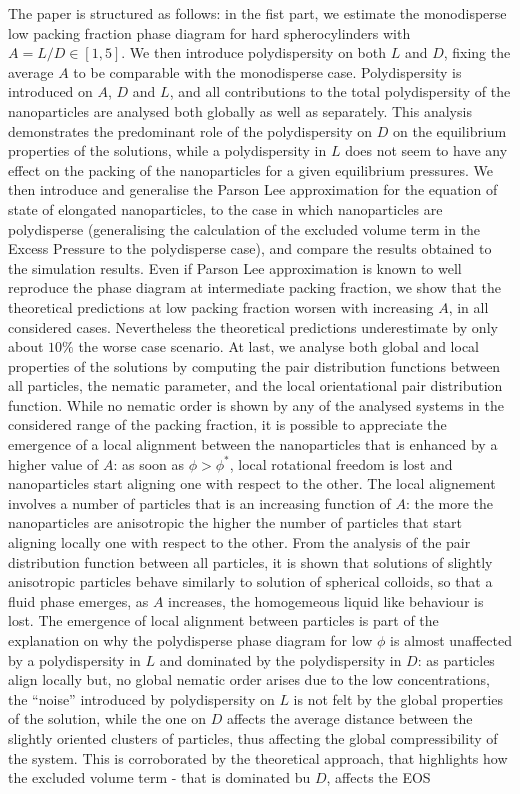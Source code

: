 \documentclass[journal=jacsat,manuscript=article]{achemso}
\begin{document}
The paper is structured as follows: in the fist part, we estimate the monodisperse low packing fraction phase diagram for hard spherocylinders with  $A=L/D \in [1,5]$. We then introduce polydispersity on both $L$ and $D$, fixing the average $A$ to be comparable with the monodisperse case. Polydispersity is introduced on $A$, $D$ and $L$, and all contributions to the total polydispersity of the nanoparticles are analysed both globally as well as separately. This analysis demonstrates the predominant role of the polydispersity on $D$ on the equilibrium properties of the solutions, while a polydispersity in $L$ does not seem to have any effect on the packing of the nanoparticles for a given equilibrium pressures. 
We then introduce and generalise the Parson Lee approximation for the equation of state of elongated nanoparticles, to the case in which nanoparticles are polydisperse (generalising the calculation of the excluded volume term in the Excess Pressure to the polydisperse case), and compare the results obtained to the simulation results. Even if Parson Lee approximation is known to well reproduce the phase diagram at intermediate packing fraction, we show that the theoretical predictions at low packing fraction  worsen with increasing $A$, in all considered cases. Nevertheless the theoretical predictions underestimate by only about $10\%$ the worse case scenario. 
At last, we analyse both global and local properties of the solutions by computing the pair distribution functions between all particles, the nematic parameter, and the local orientational pair distribution function. 
While no nematic order is shown by any of the analysed systems in the considered range of the packing fraction, it is possible to appreciate the emergence of a local alignment between the nanoparticles that is enhanced by a higher value of $A$: as soon as $\phi >\phi^*$, local rotational freedom is lost and nanoparticles start aligning one with respect to the other. The local alignement involves a number of particles that is an increasing function of $A$: the more the nanoparticles are anisotropic the higher the number of particles that start aligning locally one with respect to the other.   
From the analysis of the pair distribution function between all particles, it is shown that solutions of slightly anisotropic particles behave similarly to solution of spherical colloids, so that a fluid phase emerges, as $A$ increases, the homogemeous liquid like behaviour is lost.  
The emergence of local alignment between particles is part of the explanation on  why the polydisperse phase diagram for low $\phi$ is almost unaffected by a polydispersity in $L$ and dominated by the polydispersity in $D$: as particles align locally but, no global nematic order arises due to the low concentrations, the ``noise'' introduced by polydispersity on $L$ is not felt by the global properties of the solution, while the one on $D$ affects the average distance between the slightly oriented clusters of particles, thus affecting the global compressibility of the system. 
This is corroborated by the theoretical approach, that highlights how the excluded volume term - that is dominated bu $D$, affects the EOS
\end{document}
